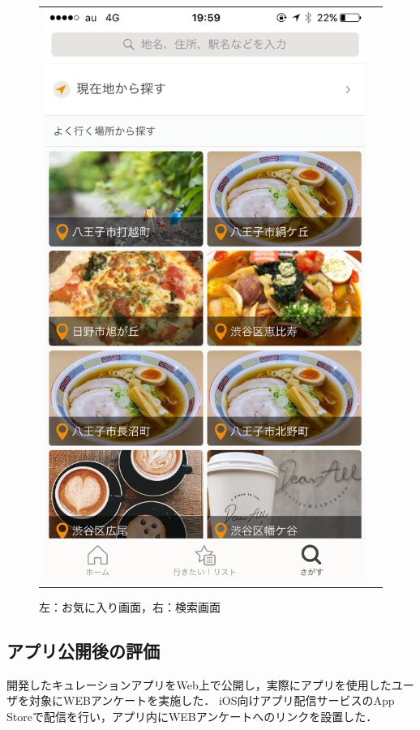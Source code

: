 \documentclass[a4paper]{jsarticle}
\begin{document}
\begin{enumerate}
\begin{enumerate}
\begin{figure}[H]
\begin{center}
\begin{tabular}{cc}
\begin{minipage}{0.35\hsize}
      \includegraphics[width=\hsize]{./images/curation_search.png}
    \end{minipage}
  \end{tabular}
    \caption{左：お気に入り画面，右：検索画面}
    \label{fig:curation_screen_structure_02}
  \end{center}
\end{figure}
\fi


\subsection{アプリ公開後の評価}
開発したキュレーションアプリをWeb上で公開し，実際にアプリを使用したユーザを対象にWEBアンケートを実施した．
iOS向けアプリ配信サービスのApp Storeで配信を行い，アプリ内にWEBアンケートへのリンクを設置した．


\end{enumerate}
\end{enumerate}
\end{document}
